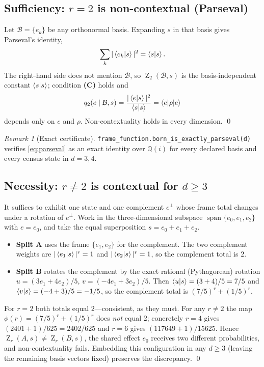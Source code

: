 \documentclass[11pt,a4paper]{article}
\theoremstyle{definition}
\theoremstyle{remark}
\newtheorem{remark}{Remark}
\newcommand{\Q}{\mathbb{Q}}
\newcommand{\basis}{\mathcal{B}}
\DeclareMathOperator{\Zframe}{Z}
\begin{document}
\subsection{Sufficiency: \texorpdfstring{$r=2$}{r=2} is non-contextual (Parseval)}

Let $\basis=\{e_k\}$ be any orthonormal basis. Expanding $s$ in that basis gives Parseval's
identity,
\begin{equation}
\sum_{k}|\braket{e_k|s}|^{2}=\braket{s|s}.
\label{eq:parseval}
\end{equation}
The right-hand side does not mention $\basis$, so $\Zframe_2(\basis,s)$ is the
basis-independent constant $\braket{s|s}$; condition \textbf{(C)} holds and
\[
q_2(e\mid\basis,s)=\frac{|\braket{e|s}|^{2}}{\braket{s|s}}=\braket{e|\rho|e}
\]
depends only on $e$ and $\rho$. Non-contextuality holds in every dimension. \qed

\begin{remark}[Exact certificate]
\texttt{frame\_function.born\_is\_exactly\_parseval(d)} verifies \eqref{eq:parseval} as an
exact identity over $\Q(i)$ for every declared basis and every census state in $d=3,4$.
\end{remark}

\subsection{Necessity: \texorpdfstring{$r\neq 2$}{r!=2} is contextual for
\texorpdfstring{$d\ge 3$}{d>=3}}

It suffices to exhibit one state and one complement $e^{\perp}$ whose frame total changes
under a rotation of $e^{\perp}$. Work in the three-dimensional subspace
$\operatorname{span}\{e_0,e_1,e_2\}$ with $e=e_0$, and take the equal superposition
$s=e_0+e_1+e_2$.
\begin{itemize}
\item \textbf{Split A} uses the frame $\{e_1,e_2\}$ for the complement. The two complement
weights are $|\braket{e_1|s}|^{r}=1$ and $|\braket{e_2|s}|^{r}=1$, so the complement total is
$2$.
\item \textbf{Split B} rotates the complement by the exact rational (Pythagorean) rotation
$u=(3e_1+4e_2)/5$, $v=(-4e_1+3e_2)/5$. Then $\braket{u|s}=(3+4)/5=7/5$ and
$\braket{v|s}=(-4+3)/5=-1/5$, so the complement total is $(7/5)^{r}+(1/5)^{r}$.
\end{itemize}
For $r=2$ both totals equal $2$---consistent, as they must. For any $r\neq 2$ the map
$\phi(r)=(7/5)^{r}+(1/5)^{r}$ does \emph{not} equal $2$; concretely $r=4$ gives
$(2401+1)/625=2402/625$ and $r=6$ gives $(117649+1)/15625$. Hence
$\Zframe_r(A,s)\neq\Zframe_r(B,s)$, the shared effect $e_0$ receives two different
probabilities, and non-contextuality fails. Embedding this configuration in any $d\ge 3$
(leaving the remaining basis vectors fixed) preserves the discrepancy. \qed
\end{document}
